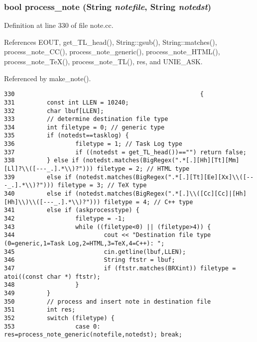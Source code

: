 \subsubsection{\setlength{\rightskip}{0pt plus 5cm}bool process\_\-note ({\bf String} {\em notefile}, {\bf String} {\em notedst})}\label{dil2al_8hh_a337}




Definition at line 330 of file note.cc.

References EOUT, get\_\-TL\_\-head(), String::gsub(), String::matches(), process\_\-note\_\-CC(), process\_\-note\_\-generic(), process\_\-note\_\-HTML(), process\_\-note\_\-Te\-X(), process\_\-note\_\-TL(), res, and UNIE\_\-ASK.

Referenced by make\_\-note().



\footnotesize\begin{verbatim}330                                                    {
331         const int LLEN = 10240;
332         char lbuf[LLEN];
333         // determine destination file type
334         int filetype = 0; // generic type
335         if (notedst==tasklog) {
336                 filetype = 1; // Task Log type
337                 if ((notedst = get_TL_head())=="") return false;
338         } else if (notedst.matches(BigRegex(".*[.][Hh][Tt][Mm][Ll]?\\([---_.].*\\)?"))) filetype = 2; // HTML type
339         else if (notedst.matches(BigRegex(".*[.][Tt][Ee][Xx]\\([---_.].*\\)?"))) filetype = 3; // TeX type
340         else if (notedst.matches(BigRegex(".*[.]\\([Cc][Cc]|[Hh][Hh]\\)\\([---_.].*\\)?"))) filetype = 4; // C++ type
341         else if (askprocesstype) {
342                 filetype = -1;
343                 while ((filetype<0) || (filetype>4)) {
344                         cout << "Destination file type (0=generic,1=Task Log,2=HTML,3=TeX,4=C++): ";
345                         cin.getline(lbuf,LLEN);
346                         String ftstr = lbuf;
347                         if (ftstr.matches(BRXint)) filetype = atoi((const char *) ftstr);
348                 }
349         }
350         // process and insert note in destination file
351         int res;
352         switch (filetype) {
353                 case 0: res=process_note_generic(notefile,notedst); break;

\end{verbatim}
